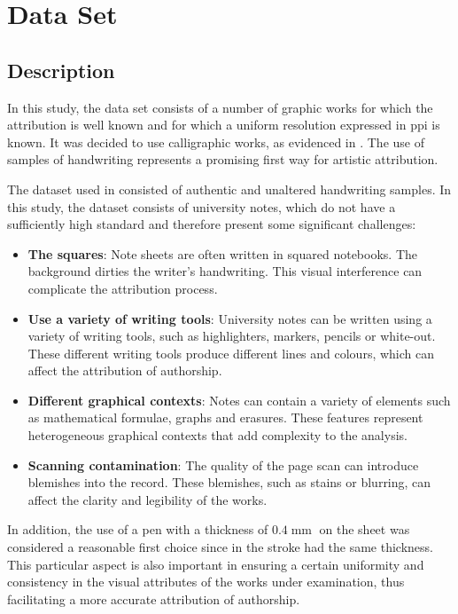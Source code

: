 \section{Data Set}
\subsection{Description}
\begin{modified} In this study, the data set consists of a number of graphic works for which the attribution is well known and for which a uniform resolution expressed in \gls{ppi} is known. It was decided to use calligraphic works, as evidenced in \cite{thesis}. The use of samples of handwriting represents a promising first way for artistic attribution. \end{modified}

\noindent The dataset used in \cite{thesis} consisted of authentic and unaltered handwriting samples. In this study, the dataset consists of university notes, which do not have a sufficiently high standard and therefore present some significant challenges:

\begin{itemize}
\item \textbf{The squares}: Note sheets are often written in squared notebooks. The background dirties the writer's handwriting. This visual interference can complicate the attribution process.
\item \textbf{Use a variety of writing tools}: University notes can be written using a variety of writing tools, such as highlighters, markers, pencils or white-out. These different writing tools produce different lines and colours, which can affect the attribution of authorship.
\item \textbf{Different graphical contexts}: Notes can contain a variety of elements such as mathematical formulae, graphs and erasures. These features represent heterogeneous graphical contexts that add complexity to the analysis.
\item \textbf{Scanning contamination}: The quality of the page scan can introduce blemishes into the record. These blemishes, such as stains or blurring, can affect the clarity and legibility of the works.
\end{itemize}

\noindent In addition, the use of a pen with a thickness of $0.4\operatorname{\mathrm{mm}}$ on the sheet was considered a reasonable first choice since in \cite{thesis} the stroke had the same thickness. This particular aspect is also important in ensuring a certain uniformity and consistency in the visual attributes of the works under examination, thus facilitating a more accurate attribution of authorship.

